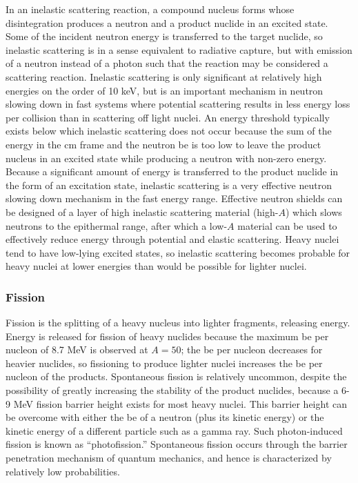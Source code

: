 In an inelastic scattering reaction, a compound nucleus forms whose disintegration produces a neutron and a product nuclide in an excited state. Some of the incident neutron energy is transferred to the target nuclide, so inelastic scattering is in a sense equivalent to radiative capture, but with emission of a neutron instead of a photon such that the reaction may be considered a scattering reaction. Inelastic scattering is only significant at relatively high energies on the order of 10 keV, but is an important mechanism in neutron slowing down in fast systems where potential scattering results in less energy loss per collision than in scattering off light nuclei. An energy threshold typically exists below which inelastic scattering does not occur because the sum of the energy in the \gls{cm} frame and the neutron \gls{be} is too low to leave the product nucleus in an excited state while producing a neutron with non-zero energy. Because a significant amount of energy is transferred to the product nuclide in the form of an excitation state, inelastic scattering is a very effective neutron slowing down mechanism in the fast energy range. Effective neutron shields can be designed of a layer of high inelastic scattering material (high-\(A\)) which slows neutrons to the epithermal range, after which a low-\(A\) material can be used to effectively reduce energy through potential and elastic scattering. Heavy nuclei tend to have low-lying excited states, so inelastic scattering becomes probable for heavy nuclei at lower energies than would be possible for lighter nuclei. 

\subsubsection{Fission}
Fission is the splitting of a heavy nucleus into lighter fragments, releasing energy. Energy is released for fission of heavy nuclides because the maximum \gls{be} per nucleon of 8.7 MeV is observed at \(A=50\); the \gls{be} per nucleon decreases for heavier nuclides, so fissioning to produce lighter nuclei increases the \gls{be} per nucleon of the products. Spontaneous fission is relatively uncommon, despite the possibility of greatly increasing the stability of the product nuclides, because a 6-9 MeV fission barrier height exists for most heavy nuclei. This barrier height can be overcome with either the \gls{be} of a neutron (plus its kinetic energy) or the kinetic energy of a different particle such as a gamma ray. Such photon-induced fission is known as ``photofission.'' Spontaneous fission occurs through the barrier penetration mechanism of quantum mechanics, and hence is characterized by relatively low probabilities. 

